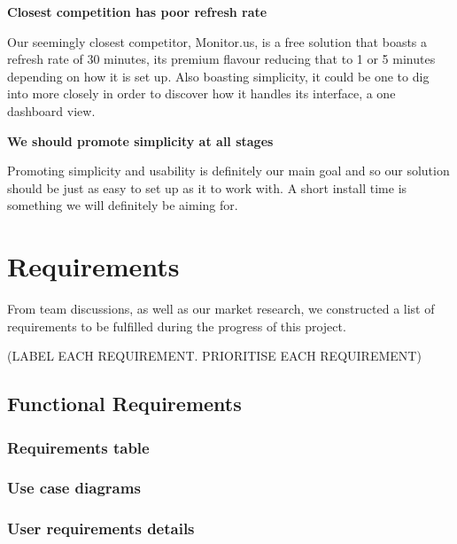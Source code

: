 \documentclass{l3proj}
\begin{document}
\textbf{Closest competition has poor refresh rate}

Our seemingly closest competitor, Monitor.us, is a free solution that boasts a refresh rate of 30 minutes, its premium flavour reducing that to 1 or 5 minutes depending on how it is set up. Also boasting simplicity, it could be one to dig into more closely in order to discover how it handles its interface, a one dashboard view.

\textbf{We should promote simplicity at all stages}

Promoting simplicity and usability is definitely our main goal and so our solution should be just as easy to set up as it to work with. A short install time is something we will definitely be aiming for.



\chapter{Requirements}
\label{req}

From team discussions, as well as our market research, we constructed a list of requirements to be fulfilled during the progress of this project.

(LABEL EACH REQUIREMENT. PRIORITISE EACH REQUIREMENT)

\section{Functional Requirements}


\subsection{Requirements table}

\subsection{Use case diagrams}

\subsection{User requirements details}
\end{document}
